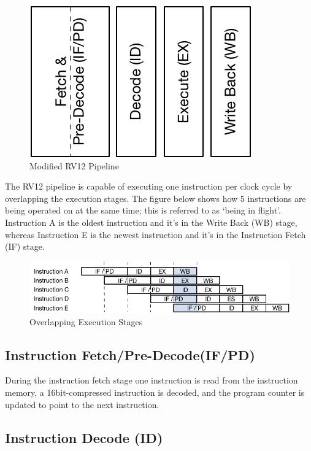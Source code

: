 \begin{figure}[hbt]
  \includegraphics{assets/img/Pipeline-RV12}
  \caption{Modified RV12 Pipeline}
\end{figure}

The RV12 pipeline is capable of executing one instruction per clock cycle by
overlapping the execution stages.  The figure below shows how 5 instructions are
being operated on at the same time; this is referred to as `being in flight'.
Instruction A is the oldest instruction and it's in the Write Back (WB) stage,
whereas Instruction E is the newest instruction and it's in the Instruction
Fetch (IF) stage.

\begin{figure}[hbt]
  \includegraphics{assets/img/Pipeline-Overlap}
  \caption{Overlapping Execution Stages}
\end{figure}

\subsection{Instruction Fetch/Pre-Decode(IF/PD)} \label{instruction-fetchpre-decode-ifpd}

During the instruction fetch stage one instruction is read from the instruction
memory, a 16bit-compressed instruction is decoded, and the program counter is
updated to point to the next instruction.

\subsection{Instruction Decode (ID)} \label{instruction-decode-id}

